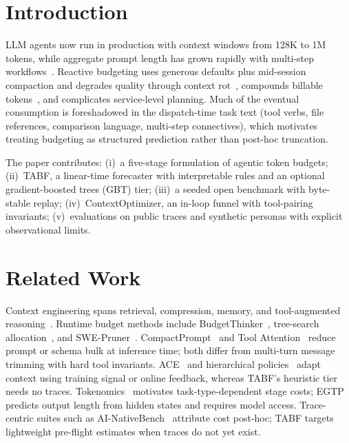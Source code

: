 \documentclass[journal]{IEEEtran}
\begin{document}
\section{Introduction}
\label{sec:intro}

LLM agents now run in production with context windows from 128K to 1M tokens,
while aggregate prompt length has grown rapidly with multi-step
workflows~\cite{aubakirova2025}. Reactive budgeting uses generous defaults plus
mid-session compaction and degrades quality through context
rot~\cite{hong2025}, compounds billable tokens~\cite{tokalator2026}, and
complicates service-level planning. Much of the eventual consumption is
foreshadowed in the dispatch-time task text (tool verbs, file references,
comparison language, multi-step connectives), which motivates treating budgeting
as structured prediction rather than post-hoc truncation.

The paper contributes: (i)~a five-stage formulation of agentic token budgets;
(ii)~TABF, a linear-time forecaster with interpretable rules and an optional
gradient-boosted trees (GBT) tier; (iii)~a seeded open benchmark with byte-stable
replay; (iv)~ContextOptimizer, an in-loop funnel with tool-pairing invariants;
(v)~evaluations on public traces and synthetic personas with explicit observational
limits.

\section{Related Work}
\label{sec:related}

Context engineering spans retrieval, compression, memory, and tool-augmented
reasoning~\cite{mei2025,mohsenimofidi2025}. Runtime budget methods include
BudgetThinker~\cite{wen2025}, tree-search allocation~\cite{li2025budget}, and
SWE-Pruner~\cite{wang2025swepruner}. CompactPrompt~\cite{wang2025compactprompt}
and Tool Attention~\cite{sadani2026} reduce prompt or schema bulk at inference
time; both differ from multi-turn message trimming with hard tool invariants.
ACE~\cite{zhang2025ace} and hierarchical policies~\cite{taparia2026} adapt
context using training signal or online feedback, whereas TABF's heuristic tier
needs no traces. Tokenomics~\cite{salim2025} motivates task-type-dependent stage
costs; EGTP~\cite{xie2026egtp} predicts output length from hidden states and
requires model access. Trace-centric suites such as AI-NativeBench~\cite{wang2026ainativebench}
attribute cost post-hoc; TABF targets lightweight pre-flight estimates when
traces do not yet exist.
\end{document}
